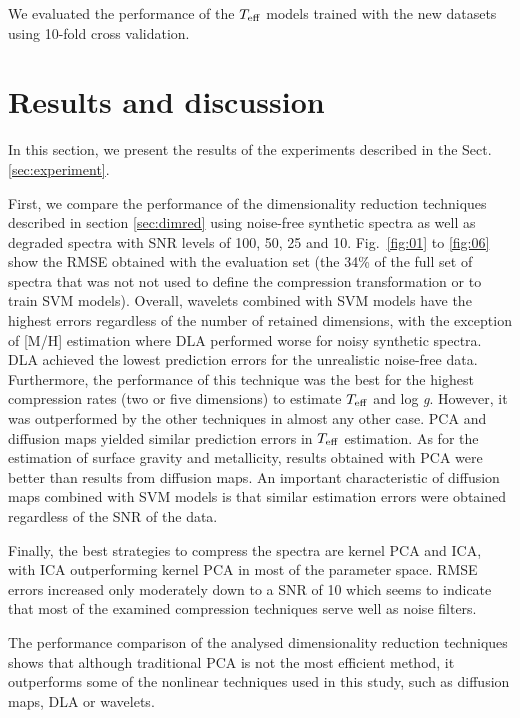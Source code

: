 \documentclass[a4paper,fleqn,usenatbib]{mnras}
\begin{document}
{{{We evaluated the performance of the $T_{\rm eff}$ models trained with
the new datasets using 10-fold cross validation.

\section{Results and discussion}
\label{sec:results}
In this section, we present the results of the experiments 
  described in the Sect. \ref{sec:experiment}.

First, we compare the performance of the dimensionality reduction
techniques described in section \ref{sec:dimred} using noise-free
synthetic spectra as well as degraded spectra with SNR levels of 100,
50, 25 and 10.  Fig.~\ref{fig:01} to \ref{fig:06} show the
RMSE obtained with the evaluation set (the 34\% of the full set of
spectra that was not not used to define the compression transformation
or to train SVM models). Overall, wavelets combined with SVM
models have the highest errors regardless of the number of retained
dimensions, with the exception of [M/H] estimation where DLA performed 
worse for noisy synthetic spectra. DLA achieved the lowest prediction 
errors for the unrealistic noise-free data. Furthermore, the performance 
of this technique was the best for the highest compression rates 
(two or five dimensions) to estimate $T_{\rm eff}$ and 
log \textit{g}. However, it was outperformed by the other techniques 
in almost any other case. PCA and diffusion maps yielded similar 
prediction errors in $T_{\rm eff}$ estimation. As for the estimation 
of surface gravity and metallicity, results obtained with PCA 
were better than results from diffusion maps. An important 
characteristic of diffusion maps combined with SVM models is that 
similar estimation errors were obtained regardless of the SNR of 
the data.

Finally, the best strategies to compress the spectra are kernel PCA 
and ICA, with ICA outperforming kernel PCA in most of the parameter
space. RMSE errors increased only moderately down to a SNR of 10
which seems to indicate that most of the examined compression
techniques serve well as noise filters.

The performance comparison of the analysed dimensionality reduction
techniques shows that although traditional PCA is not the most
efficient method, it outperforms some of the nonlinear techniques used
in this study, such as diffusion maps, DLA or wavelets.

}}}
\end{document}
